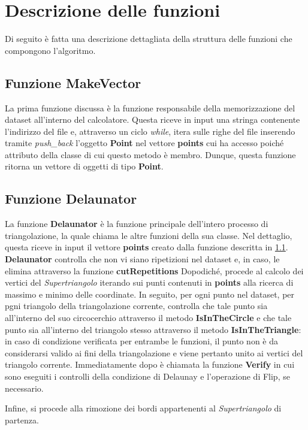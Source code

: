 \documentclass{article}
\begin{document}
\section{Descrizione delle funzioni}
Di seguito è fatta una descrizione dettagliata della struttura delle funzioni che compongono l'algoritmo.

\subsection{Funzione MakeVector}\label{sez 4.1}
La prima funzione discussa è la funzione responsabile della memorizzazione del dataset all'interno del calcolatore.  Questa riceve in input una stringa contenente l'indirizzo del file e,  attraverso un ciclo \emph{while},  itera sulle righe del file inserendo tramite \emph{push\_back} l'oggetto \textbf{Point} nel vettore \textbf{points} cui ha accesso poiché attributo della classe di cui questo metodo è membro.
Dunque,  questa funzione ritorna un vettore di oggetti di tipo \textbf{Point}.

\subsection{Funzione Delaunator}
La funzione \textbf{Delaunator} è la funzione principale dell'intero processo di triangolazione,  la quale chiama le altre funzioni della sua classe.  
Nel dettaglio,  questa riceve in input il vettore \textbf{points} creato dalla funzione descritta in \ref{sez 4.1}.  \textbf{Delaunator} controlla che non vi siano ripetizioni nel dataset e,  in caso,  le elimina attraverso la funzione \textbf{cutRepetitions}
Dopodiché,  procede al calcolo dei vertici del \emph{Supertriangolo} iterando sui punti contenuti in \textbf{points} alla ricerca di massimo e minimo delle coordinate.
In seguito,  per ogni punto nel dataset,  per pgni triangolo della triangolazione corrente,  controlla che tale punto sia all'interno del suo circocerchio attraverso il metodo \textbf{IsInTheCircle} e che tale punto sia all'interno del triangolo stesso attraverso il metodo \textbf{IsInTheTriangle}: in caso di condizione verificata per entrambe le funzioni,  il punto non è da considerarsi valido ai fini della triangolazione e viene pertanto unito ai vertici del triangolo corrente.  Immediatamente dopo è chiamata la funzione \textbf{Verify} in cui sono eseguiti i controlli della condizione di Delaunay e l'operazione di Flip, se necessario.

\noindent Infine,  si procede alla rimozione dei bordi appartenenti al \emph{Supertriangolo} di partenza.
\end{document}
